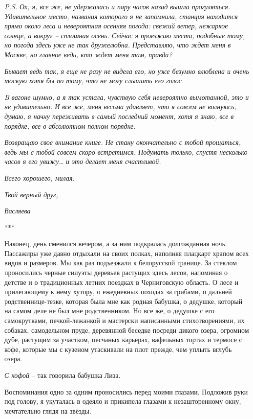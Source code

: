 \documentclass[
]{book}
\begin{document}
\emph{P.S. Ох, я, все же, не удержалась и пару часов назад вышла прогуляться. Удивительное место, названия которого я не запомнила, станция находится прямо около леса и невероятная осенняя погода: свежий ветер, нежаркое солнце, а вокруг -- сплошная осень. Сейчас я проезжаю места, подобные тому, но погода здесь уже не так дружелюбна. Представляю, что ждет меня в Москве, но главное ведь, кто ждет меня там, правда? }

\emph{Бывает ведь так, я еще не разу не видела его, но уже безумно влюблена и очень тоскую хотя бы по тому, что не могу слышать его голос. }

\emph{B вагоне шумно, а я так устала, чувствую себя невероятно вымотанной, это и не удивительно. И все же, меня весьма удивляет, что я совсем не волнуюсь, думаю, я начну переживать в самый последний момент, хотя я знаю, все в порядке, все в абсолютном полном порядке. }

\emph{Возвращаю свое внимание книге. Не стану окончательно с тобой прощаться, ведь мы с тобой совсем скоро встретимся. Подумать только, спустя несколько часов я его увижу\ldots{} и это делает меня счастливой. }

\emph{Всего хорошего, милая.}

\emph{Твой верный друг, }

\emph{Васляева}

***

Наконец, день сменился вечером, а за ним подкралась долгожданная ночь. Пассажиры уже давно отдыхали на своих полках, наполняя плацкарт храпом всех видов и размеров. Мы как раз подъезжали к белорусской границе. За стеклом проносились черные силуэты деревьев растущих здесь лесов, напоминая о детстве и о традиционных летних поездках в Черниговскую область. О лесе и прилегающему к нему хутору, о ежедневных походах за грибами, о дальней родственнице-тезке, которая была мне как родная бабушка, о дедушке, который на самом деле не был мне родственником. Но все же, о дедушке с его самокрутками, печкой-лежанкой и мастерски написанными стихотворениями, их собаках, самодельном пруде, деревянной беседке посреди дикого озера, огромном дубе, растущим за участком, песчаных карьерах, вафельных тортах и термосе с кофе, которые мы с кузеном утаскивали на плот прежде, чем уплыть вглубь озера.

\emph{С кофой} -- так говорила бабушка Лиза.

Воспоминания одно за одним проносились перед моими глазами. Подложив руки под голову, я укуталась в одеяло и прикипела глазами к незашторенному окну, мечтательно глядя на звёзды.
\end{document}
